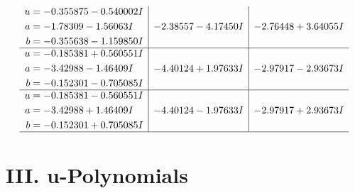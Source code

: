 \documentclass[1p]{elsarticle_modified}
\theoremstyle{definition}
\begin{document}
$$\begin{array}{c|c|c}
\begin{aligned}
u &= -0.355875 - 0.540002 I \\
a &= -1.78309 - 1.56063 I \\
b &= -0.355638 - 1.159850 I\end{aligned}
 & -2.38557 - 4.17450 I & -2.76448 + 3.64055 I \\ \hline\begin{aligned}
u &= -0.185381 + 0.560551 I \\
a &= -3.42988 - 1.46409 I \\
b &= -0.152301 - 0.705085 I\end{aligned}
 & -4.40124 + 1.97633 I & -2.97917 - 2.93673 I \\ \hline\begin{aligned}
u &= -0.185381 - 0.560551 I \\
a &= -3.42988 + 1.46409 I \\
b &= -0.152301 + 0.705085 I\end{aligned}
 & -4.40124 - 1.97633 I & -2.97917 + 2.93673 I\\
 \hline 
 \end{array}$$\newpage
\newpage\renewcommand{\arraystretch}{1}
\centering \section*{ III. u-Polynomials}
\end{document}
